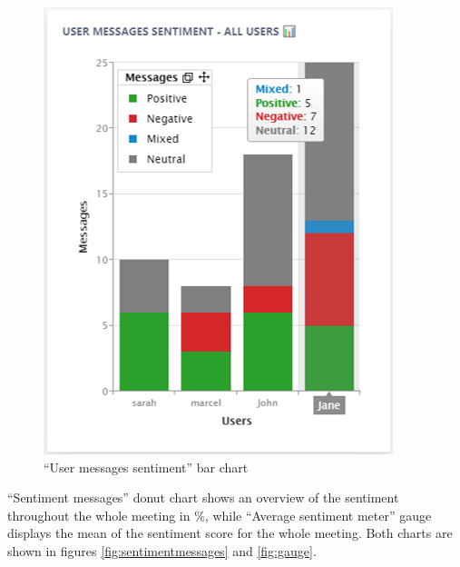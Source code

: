 \documentclass{article}
\begin{document}
\begin{figure}[H]
\begin{minipage}{.5\textwidth}
  \includegraphics[width=1\linewidth]{charts/usermessagessentiment.png}
  \caption{``User messages sentiment'' bar chart}
  \label{fig:usermessagessentiment}
\end{minipage}
\end{figure}

{\large 
``Sentiment messages'' donut chart shows an overview of the sentiment throughout the whole meeting in \%, while ``Average sentiment meter'' gauge displays the mean of the sentiment score for the whole meeting. Both charts are shown in figures \ref{fig:sentimentmessages} and \ref{fig:gauge}.\par
}
\end{document}
